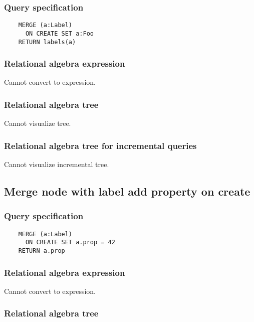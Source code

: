 	\subsubsection*{Query specification}

	\begin{lstlisting}
	MERGE (a:Label)
	  ON CREATE SET a:Foo
	RETURN labels(a)
	\end{lstlisting}


	\subsubsection*{Relational algebra expression}

	Cannot convert to expression.

	\subsubsection*{Relational algebra tree}

	Cannot visualize tree.

	\subsubsection*{Relational algebra tree for incremental queries}

	Cannot visualize incremental tree.
	\subsection{Merge node with label add property on create}

	\subsubsection*{Query specification}

	\begin{lstlisting}
	MERGE (a:Label)
	  ON CREATE SET a.prop = 42
	RETURN a.prop
	\end{lstlisting}


	\subsubsection*{Relational algebra expression}

	Cannot convert to expression.

	\subsubsection*{Relational algebra tree}

